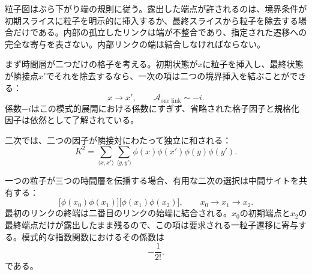 粒子図はぶら下がり端の規則に従う。露出した端点が許されるのは、境界条件が初期スライスに粒子を明示的に挿入するか、最終スライスから粒子を除去する場合だけである。内部の孤立したリンクは端が不整合であり、指定された遷移への完全な寄与を表さない。内部リンクの端は結合しなければならない。

まず時間層が二つだけの格子を考える。初期状態が\(x\)に粒子を挿入し、最終状態が隣接点\(x'\)でそれを除去するなら、一次の項は二つの境界挿入を結ぶことができる：
\begin{equation}
x\longrightarrow x',
\qquad
\mathcal{A}_{\text{one link}}\sim -i.
\end{equation}
係数\(-i\)はこの模式的展開における係数にすぎず、省略された格子因子と規格化因子は依然として了解されている。

\begin{classroomqa}
\end{classroomqa}

二次では、二つの因子が隣接対にわたって独立に和される：
\begin{equation}
K^2
=
\sum_{\langle x,x'\rangle}
\sum_{\langle y,y'\rangle}
\phi(x)\phi(x')\phi(y)\phi(y').
\end{equation}

\begin{classroomqa}
\end{classroomqa}

一つの粒子が三つの時間層を伝播する場合、有用な二次の選択は中間サイトを共有する：
\begin{equation}
\bigl[\phi(x_0)\phi(x_1)\bigr]
\bigl[\phi(x_1)\phi(x_2)\bigr],
\qquad
x_0\longrightarrow x_1\longrightarrow x_2.
\end{equation}
最初のリンクの終端は二番目のリンクの始端に結合される。\(x_0\)の初期端点と\(x_2\)の最終端点だけが露出したまま残るので、この項は要求される一粒子遷移に寄与する。模式的な指数関数におけるその係数は
\begin{equation}
-\frac{1}{2!}.
\end{equation}
である。

